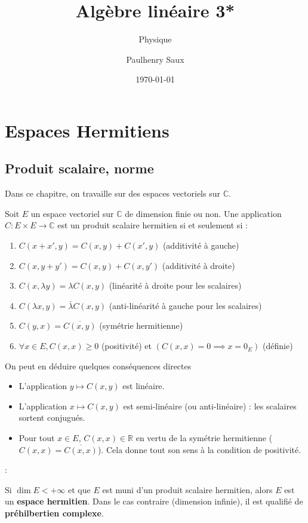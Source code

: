 \documentclass[french]{yLectureNote}
\title{Algèbre linéaire 3*}
\subtitle{Physique}
\author{Paulhenry Saux}
\date{\today}
\begin{document}
\setcounter{chapter}{2}
\chapter{Espaces Hermitiens}
\section{Produit scalaire, norme}
Dans ce chapitre, on travaille sur des espaces vectoriels sur $\mathbb{C}$.

\begin{definition}
    Soit $E$ un espace vectoriel sur $\mathbb{C}$ de dimension finie ou non. Une application $C: E \times E \to \mathbb{C}$ est un produit scalaire hermitien si et seulement si :
    \begin{enumerate}
        \item $C(x+x', y) = C(x, y) + C(x', y)$ (additivité à gauche)
        \item $C(x, y+y') = C(x, y) + C(x, y')$ (additivité à droite)
        \item $C(x, \lambda y) = \lambda C(x, y)$ (linéarité à droite pour les scalaires)
        \item $C(\lambda x, y) = \bar{\lambda} C(x, y)$ (anti-linéarité à gauche pour les scalaires)
        \item $C(y, x) = \overline{C(x, y)}$ (symétrie hermitienne)
        \item $\forall x \in E, C(x, x) \ge 0$ (positivité) et $\left(C(x, x) = 0 \implies x = 0_E\right)$ (définie)
    \end{enumerate}
\end{definition}


On peut en déduire quelques conséquences directes 
\begin{itemize}
    \item L'application $y \mapsto C(x, y)$ est linéaire.
\item  L'application $x \mapsto C(x, y)$ est semi-linéaire (ou anti-linéaire) : les scalaires sortent conjugués.
\item  Pour tout $x \in E$, $C(x, x) \in \mathbb{R}$ en vertu de la symétrie hermitienne ($C(x,x) = \overline{C(x,x)}$). Cela donne tout son sens à la condition de positivité.
\end{itemize}:
\begin{definition}
    Si $\dim E < +\infty$ et que $E$ est muni d'un produit scalaire hermitien, alors $E$ est un \textbf{espace hermitien}. Dans le cas contraire (dimension infinie), il est qualifié de \textbf{préhilbertien complexe}.
\end{definition}
\end{document}

